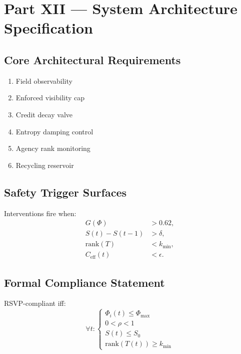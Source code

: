 \documentclass[11pt,a4paper]{article}
\theoremstyle{plain}
\theoremstyle{definition}
\theoremstyle{remark}
\begin{document}
\newpage

\section*{Part XII — System Architecture Specification}

\subsection{Core Architectural Requirements}

\begin{enumerate}
  \item Field observability
  \item Enforced visibility cap
  \item Credit decay valve
  \item Entropy damping control
  \item Agency rank monitoring
  \item Recycling reservoir
\end{enumerate}

\subsection{Safety Trigger Surfaces}

Interventions fire when:
\begin{align}
G(\Phi) &> 0.62, \\
S(t) - S(t-1) &> \delta, \\
\text{rank}(T) &< k_{\min}, \\
C_{\text{eff}}(t) &< \epsilon.
\end{align}

\subsection{Formal Compliance Statement}

RSVP-compliant iff:
\[
\forall t: 
\begin{cases}
\Phi_i(t) \le \Phi_{\max} \\
0 < \rho < 1 \\
S(t) \le S_0 \\
\text{rank}(T(t)) \ge k_{\min}
\end{cases}
\]
\end{document}
